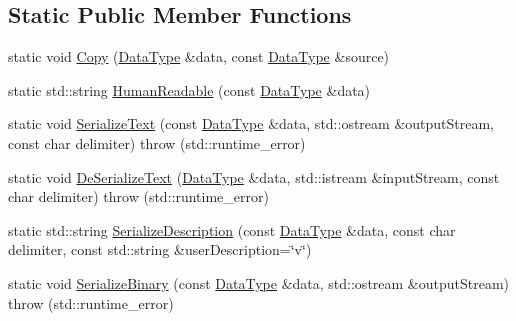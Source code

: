 \subsection*{Static Public Member Functions}
\begin{DoxyCompactItemize}
\item 
static void \hyperlink{classcmn_data_3_01std_1_1vector_3_01__element_type_01_4_01_4_ae453c8bec96e236e157e30ef793f1deb}{Copy} (\hyperlink{classcmn_data_3_01std_1_1vector_3_01__element_type_01_4_01_4_a7a5332ebd12138b5f6d8b856cd3fdfd5}{Data\-Type} \&data, const \hyperlink{classcmn_data_3_01std_1_1vector_3_01__element_type_01_4_01_4_a7a5332ebd12138b5f6d8b856cd3fdfd5}{Data\-Type} \&source)
\item 
static std\-::string \hyperlink{classcmn_data_3_01std_1_1vector_3_01__element_type_01_4_01_4_a49bc774aae496bf06bc80f767e9a0df4}{Human\-Readable} (const \hyperlink{classcmn_data_3_01std_1_1vector_3_01__element_type_01_4_01_4_a7a5332ebd12138b5f6d8b856cd3fdfd5}{Data\-Type} \&data)
\item 
static void \hyperlink{classcmn_data_3_01std_1_1vector_3_01__element_type_01_4_01_4_a3b28193010a0e63d42323a83ed005aac}{Serialize\-Text} (const \hyperlink{classcmn_data_3_01std_1_1vector_3_01__element_type_01_4_01_4_a7a5332ebd12138b5f6d8b856cd3fdfd5}{Data\-Type} \&data, std\-::ostream \&output\-Stream, const char delimiter)  throw (std\-::runtime\-\_\-error)
\item 
static void \hyperlink{classcmn_data_3_01std_1_1vector_3_01__element_type_01_4_01_4_a1430b1ded7b53e4bd1cc979fab5d7fb1}{De\-Serialize\-Text} (\hyperlink{classcmn_data_3_01std_1_1vector_3_01__element_type_01_4_01_4_a7a5332ebd12138b5f6d8b856cd3fdfd5}{Data\-Type} \&data, std\-::istream \&input\-Stream, const char delimiter)  throw (std\-::runtime\-\_\-error)
\item 
static std\-::string \hyperlink{classcmn_data_3_01std_1_1vector_3_01__element_type_01_4_01_4_acf70f891b565c1cf72d0490f1d867359}{Serialize\-Description} (const \hyperlink{classcmn_data_3_01std_1_1vector_3_01__element_type_01_4_01_4_a7a5332ebd12138b5f6d8b856cd3fdfd5}{Data\-Type} \&data, const char delimiter, const std\-::string \&user\-Description=\char`\"{}v\char`\"{})
\item 
static void \hyperlink{classcmn_data_3_01std_1_1vector_3_01__element_type_01_4_01_4_a7760738008950d2ed8fa00bafb1190f8}{Serialize\-Binary} (const \hyperlink{classcmn_data_3_01std_1_1vector_3_01__element_type_01_4_01_4_a7a5332ebd12138b5f6d8b856cd3fdfd5}{Data\-Type} \&data, std\-::ostream \&output\-Stream)  throw (std\-::runtime\-\_\-error)

\end{DoxyCompactItemize}
